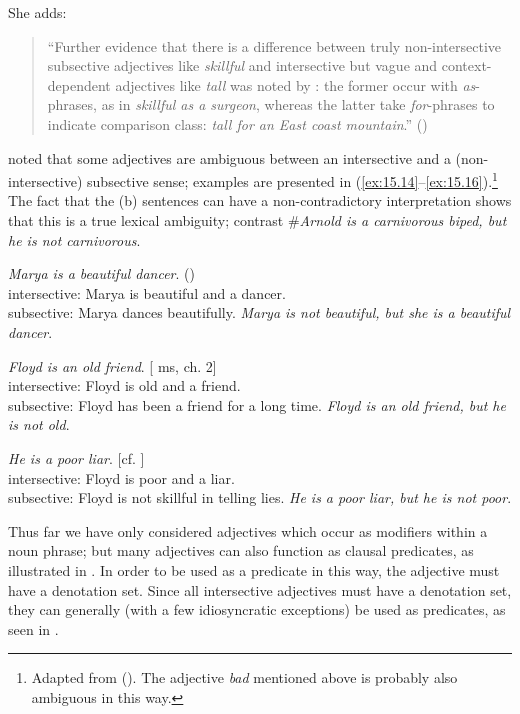 She adds:
\begin{quote}
“Further evidence that there is a difference between truly non-intersective subsective adjectives like \textit{skillful} and intersective but vague and context-dependent adjectives like \textit{tall} was noted by \citet{Siegel1976}: the former occur with \textit{as}-phrases, as in \textit{skillful as a surgeon}, whereas the latter take \textit{for}-phrases to indicate comparison class: \textit{tall for an East coast mountain}.” (\citealt{Partee2007})
\end{quote}


\citet{Bolinger1967} noted that some adjectives are ambiguous between an intersective and a (non-intersective) subsective sense; examples are presented in (\ref{ex:15.14}--\ref{ex:15.16}).\footnote{Adapted from \citealt{Morzycki2013} (). The adjective \textit{bad} mentioned above is probably also ambiguous in this way.} The fact that the (b) sentences can have a non-contradictory interpretation shows that this is a true lexical ambiguity; contrast \#\textit{Arnold is a carnivorous biped, but he is not carnivorous}.


\ea \label{ex:15.14}
\ea \label{ex:15.}  \textit{Marya is a beautiful dancer}.   (\citealt{Siegel1976})\\
intersective: Marya is beautiful and a dancer.\\
subsective: Marya dances beautifully.
\ex  \textit{Marya is not beautiful, but she is a beautiful dancer}.
\z \z

\ea \label{ex:15.15}
\ea \label{ex:15.} \textit{Floyd is an old friend}.  \hfill [\citealt{Morzycki2013} ms, ch. 2]\\
intersective: Floyd is old and a friend.\\
subsective: Floyd has been a friend for a long time.
\ex  \textit{Floyd is an old friend, but he is not old}.
\z \z

\ea \label{ex:15.16}
\ea \label{ex:15.}  \textit{He is a poor liar}.  \hfill [cf. \citealt{Bolinger1967}]\\
intersective: Floyd is poor and a liar.\\
subsective: Floyd is not skillful in telling lies.
\ex  \textit{He is a poor liar, but he is not poor}.
\z \z


Thus far we have only considered adjectives which occur as modifiers within a noun phrase; but many adjectives can also function as clausal predicates, as illustrated in . In order to be used as a predicate in this way, the adjective must have a denotation set. Since all intersective adjectives must have a denotation set, they can generally (with a few idiosyncratic exceptions) be used as predicates, as seen in .


